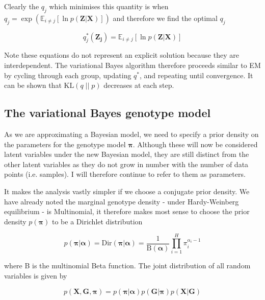 \documentclass{article}
\begin{document}
Clearly the $q_j$ which minimises this quantity is when $q_j = \exp(\mathbb{E}_{i \ne j}[\ln p(\boldsymbol{Z} | \boldsymbol{X})])$ and therefore we find the optimal $q_j$

\begin{equation}
\label{eq:q_opt}
q^*_j(\boldsymbol{Z_j}) = \mathbb{E}_{i \ne j}[\ln p(\boldsymbol{Z} | \boldsymbol{X})]
\end{equation}

Note these equations do not represent an explicit solution because they are interdependent. The variational Bayes algorithm therefore proceeds similar to EM by cycling through each group, updating $q^*$, and repeating until convergence. It can be shown that $\text{KL}(q\; ||\; p)$ decreases at each step.

\subsection{The variational Bayes genotype model}

As we are approximating a Bayesian model, we need to specify a prior density on the parameters for the genotype model $\boldsymbol{\pi}$. Although these will now be considered latent variables under the new Bayesian model, they are still distinct from the other latent variables as they do not grow in number with the number of data points (i.e. samples). I will therefore continue to refer to them as parameters. 

It makes the analysis vastly simpler if we choose a conjugate prior density. We have already noted the marginal genotype density - under Hardy-Weinberg equilibrium - is Multinomial, it therefore makes most sense to choose the prior density $p(\boldsymbol{\pi})$ to be a Dirichlet distribution

\begin{equation}
p(\boldsymbol{\pi} | \boldsymbol{\alpha}) = \text{Dir}(\boldsymbol{\pi} | \boldsymbol{\alpha}) = \frac{1}{\text{B}(\boldsymbol{\alpha})} \prod_{i = 1}^H \pi_i^{\alpha_i - 1}
\end{equation}

where B is the multinomial Beta function. The joint distribution of all random variables is given by

\begin{equation}
p(\boldsymbol{X}, \boldsymbol{G}, \boldsymbol{\pi}) = p(\boldsymbol{\pi} | \boldsymbol{\alpha}) p(\boldsymbol{G} | \boldsymbol{\pi}) p(\boldsymbol{X} | \boldsymbol{G})
\end{equation}
\end{document}
